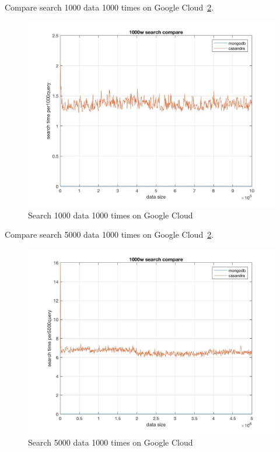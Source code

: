 Compare search 1000 data 1000 times on Google Cloud~\ref{f:fly}.

\begin{figure}[!ht]
  \centering\includegraphics[width=\columnwidth]
  {images/search_comp_1000_google.jpg}
  \caption{Search 1000 data 1000 times on Google Cloud}\label{f:fly}
\end{figure}

Compare search 5000 data 1000 times on Google Cloud~\ref{f:fly}.

\begin{figure}[!ht]
  \centering\includegraphics[width=\columnwidth]
  {images/search_comp_5000_google.jpg}
  \caption{Search 5000 data 1000 times on Google Cloud}\label{f:fly}
\end{figure}


